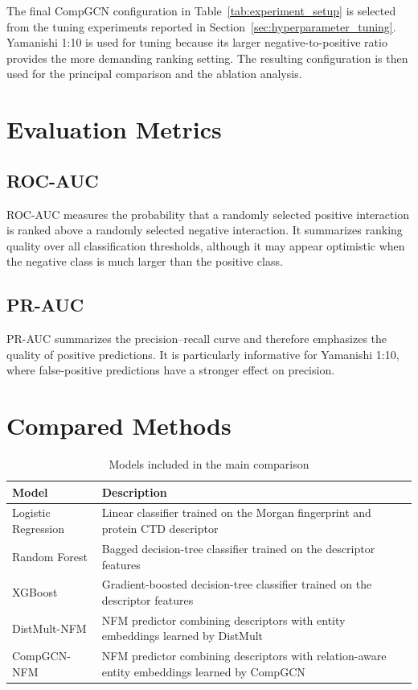 The final CompGCN configuration in Table~\ref{tab:experiment_setup} is selected
from the tuning experiments reported in Section~\ref{sec:hyperparameter_tuning}.
Yamanishi 1:10 is used for tuning because its larger negative-to-positive ratio
provides the more demanding ranking setting. The resulting configuration is
then used for the principal comparison and the ablation analysis.

\section{Evaluation Metrics}

\subsection{ROC-AUC}

ROC-AUC measures the probability that a randomly selected positive interaction
is ranked above a randomly selected negative interaction. It summarizes ranking
quality over all classification thresholds, although it may appear optimistic
when the negative class is much larger than the positive class.

\subsection{PR-AUC}

PR-AUC summarizes the precision--recall curve and therefore emphasizes the
quality of positive predictions. It is particularly informative for Yamanishi
1:10, where false-positive predictions have a stronger effect on precision.

\section{Compared Methods}

\begin{table}[H]
\centering
\caption{Models included in the main comparison}
\label{tab:baseline_models}
\begin{tabularx}{\textwidth}{lX}
\toprule
\textbf{Model} & \textbf{Description} \\
\midrule
Logistic Regression & Linear classifier trained on the Morgan fingerprint and protein CTD descriptor \\
Random Forest & Bagged decision-tree classifier trained on the descriptor features \\
XGBoost & Gradient-boosted decision-tree classifier trained on the descriptor features \\
DistMult-NFM & NFM predictor combining descriptors with entity embeddings learned by DistMult \\
CompGCN-NFM & NFM predictor combining descriptors with relation-aware entity embeddings learned by CompGCN \\
\bottomrule
\end{tabularx}
\end{table}

